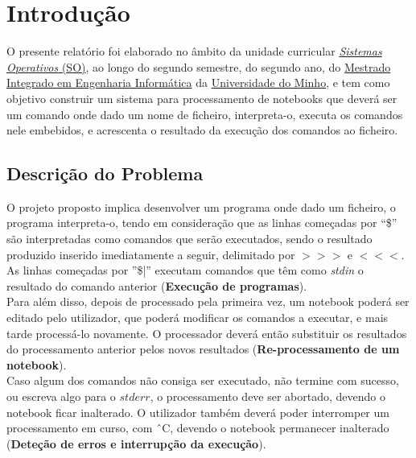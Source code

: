 \documentclass[a4paper]{article}
\begin{document}
\pagebreak

\tableofcontents

\pagebreak


\section{Introdução}
\label{sec:intro}

O presente relatório foi elaborado no âmbito da unidade curricular
\href{http://miei.di.uminho.pt/plano_estudos.html#sistemas_operativos}
{\emph {Sistemas Operativos} (SO)}, ao longo do segundo semestre,
do segundo ano, do \href{http://miei.di.uminho.pt}{Mestrado Integrado em Engenharia Informática}
da \href{https://www.uminho.pt}{Universidade do Minho}, e tem como objetivo
construir um sistema para processamento de notebooks que deverá ser um comando
onde dado um nome de ficheiro, interpreta-o, executa os comandos nele embebidos,
e acrescenta o resultado da execução dos comandos ao ficheiro.


\subsection{Descrição do Problema}
\label{sec:problema}

O projeto proposto implica desenvolver um programa onde dado um ficheiro, o programa
interpreta-o, tendo em consideração que as linhas começadas por ``\$'' são interpretadas como
comandos que serão executados, sendo o resultado produzido inserido imediatamente a seguir,
delimitado por $>>>$ e $<<<$. As linhas começadas por ''\$|'' executam comandos
que têm como \emph{stdin} o resultado do comando anterior (\textbf{Execução de programas}).\\

Para além disso, depois de processado pela primeira vez,
um notebook poderá ser editado pelo utilizador,
que poderá modificar os comandos a executar, e mais tarde processá-lo novamente.
O processador deverá então substituir os resultados do processamento anterior pelos novos resultados
(\textbf{Re-processamento de um notebook}).\\

Caso algum dos comandos não consiga ser executado,
não termine com sucesso, ou escreva algo para o $stderr$, o processamento deve ser abortado,
devendo o notebook ficar inalterado. O utilizador também deverá poder interromper
um processamento em curso, com ˆC, devendo o notebook permanecer inalterado
(\textbf{Deteção de erros e interrupção da execução}).\\
\end{document}
